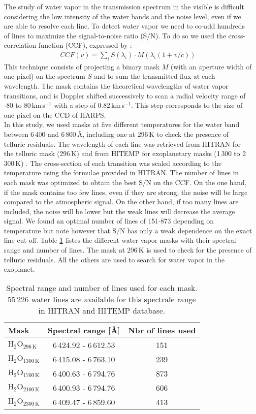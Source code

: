 \documentclass{aa}
\begin{document}
The study of water vapor in the transmission spectrum in the visible is difficult considering the low intensity of the water bands and the noise level, even if we are able to resolve each line. To detect water vapor we need to co-add hundreds of lines to maximize the signal-to-noise ratio (S/N). To do so we used the cross-correlation function (CCF), expressed by :
\begin{eqnarray}
CCF(v)=\sum_{i} S(\lambda_{i}) \cdot M(\lambda_{i}(1+v/c))
\label{equation CCF}
\end{eqnarray}
This technique \citep{baranne_1996,pepe_2002_coralie} consists of projecting a binary mask $M$ (with an aperture width of one pixel) on the spectrum $S$ and to sum the transmitted flux at each wavelength. The mask contains the theoretical wavelengths of water vapor transitions, and is Doppler shifted successively to scan a radial velocity range of -80 to 80\,km\,s$^{-1}$ with a step of 0.82\,km\,s$^{-1}$. This step corresponds to the size of one pixel on the CCD of HARPS.\\
In this study, we used masks at five different temperatures for the water band between 6\,400 and 6\,800\,\AA , including one at 296\,K to check the presence of telluric residuals. The wavelength of each line was retrieved from HITRAN for the telluric mask (296\,K) and from HITEMP for exoplanetary masks (1\,300 to 2\,300\,K) \citep{rothman_hitran_2009,rothman_hitemp_2010}. The cross-section of each transition was scaled according to the temperature using the formulae provided in HITRAN. The number of lines in each mask was optimized to obtain the best S/N on the CCF. On the one hand, if the mask contains too few lines, even if they are strong, the noise will be large compared to the atmospheric signal. On the other hand, if too many lines are included, the noise will be lower but the weak lines will decrease the average signal. We found an optimal number of lines of 151-873 depending on temperature but note however that S/N has only a weak dependence on the exact line cut-off.
Table \ref{masque stellaire} listes the different water vapor masks with their spectral range and number of lines. The mask at 296\,K is used to check for the presence of telluric residuals. All the others are used to search for water vapor in the exoplanet.
\begin{table}[h]
\centering
\caption{Spectral range and number of lines used for each mask. 55\,226 water lines are available for this spectrale range in HITRAN and HITEMP database.}
\begin{tabular}{lcc}
\hline
Mask & Spectral range [\AA] & Nbr of lines used \\
\hline
$\mathrm{H_{2}O_{296\,K}}$&6\,424.92 - 6\,612.53&151 \\
$\mathrm{H_{2}O_{1300\,K}}$&6\,415.08 - 6\,763.10&239 \\
$\mathrm{H_{2}O_{1700\,K}}$&6\,400.63 - 6\,794.76&873 \\
$\mathrm{H_{2}O_{2100\,K}}$&6\,400.93 - 6\,794.76&606 \\
$\mathrm{H_{2}O_{2300\,K}}$&6\,409.47 - 6\,859.60&413 \\
\hline
\end{tabular}
\label{masque stellaire}
\end{table}
\end{document}
